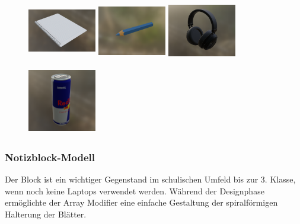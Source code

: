 \begin{figure}[H]
    \centering
    \begin{minipage}[b]{0.20\textwidth}
        \centering
        \includegraphics[width=3cm,height=3cm]{images/notizblock.png}
    \end{minipage}
    \hfill
    \begin{minipage}[b]{0.20\textwidth}
        \centering
        \includegraphics[width=3cm,height=3cm]{images/stift.png}
    \end{minipage}
    \hfill
    \begin{minipage}[b]{0.20\textwidth}
        \centering
        \includegraphics[width=3cm,height=3cm]{images/headphones.png}
    \end{minipage}
    \hfill
    \begin{minipage}[b]{0.20\textwidth}
        \centering
        \includegraphics[width=3cm,height=3cm]{images/energy.png}
    \end{minipage}
\end{figure}

\subsubsection*{Notizblock-Modell}
Der Block ist ein wichtiger Gegenstand im schulischen Umfeld bis zur 3. Klasse, wenn noch keine Laptops verwendet werden. Während der Designphase ermöglichte der Array Modifier eine einfache Gestaltung der spiralförmigen Halterung der Blätter.

